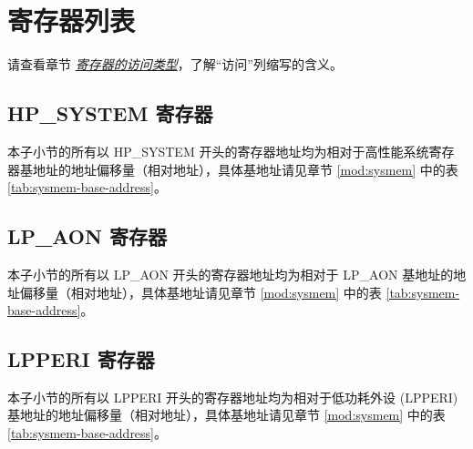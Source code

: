 \documentclass[main\_\_CN.tex]{subfiles}
\begin{document}

\clearpage
\hypertarget{sysreg-reg-summ}{}
\section{寄存器列表}
\label{sec:sysreg-reg-summ}

请查看章节 \hyperref[glossary-access-types]{\textit{寄存器的访问类型}}，了解“访问”列缩写的含义。

\subsection{HP\_SYSTEM 寄存器}
\label{sec:sysreg-reg-summ-sysreg}

本子小节的所有以 HP\_SYSTEM 开头的寄存器地址均为相对于高性能系统寄存器基地址的地址偏移量（相对地址），具体基地址请见章节 \ref{mod:sysmem} \textit{} 中的表 \ref{tab:sysmem-base-address}。



\subsection{LP\_AON 寄存器}
\label{sec:sysreg-reg-summ-lpaon}

本子小节的所有以 LP\_AON 开头的寄存器地址均为相对于 LP\_AON 基地址的地址偏移量（相对地址），具体基地址请见章节 \ref{mod:sysmem} \textit{} 中的表 \ref{tab:sysmem-base-address}。



\subsection{LPPERI 寄存器}
\label{sec:sysreg-reg-summ-lpperi}

本子小节的所有以 LPPERI 开头的寄存器地址均为相对于低功耗外设 (LPPERI) 基地址的地址偏移量（相对地址），具体基地址请见章节 \ref{mod:sysmem} \textit{} 中的表 \ref{tab:sysmem-base-address}。




\end{document}
